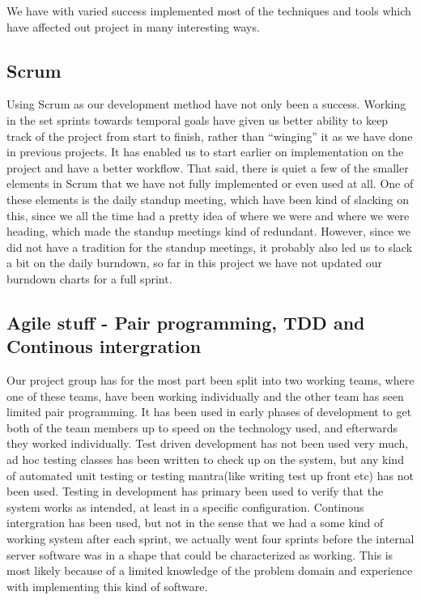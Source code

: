 We have with varied success implemented most of the techniques and tools which have affected out project in many interesting ways.

\subsection*{Scrum}
Using Scrum as our development method have not only been a success. Working in the set sprints towards temporal goals
have given us better ability to keep track of the project from start to finish, rather than ``winging'' it as we have done in previous projects.
It has enabled us to start earlier on implementation on the project and have a better workflow.
That said, there is quiet a few of the smaller elements in Scrum that we have not fully implemented or even used at all.
One of these elements is the daily standup meeting, which have been kind of slacking on this, since we all the time had a pretty idea of where we
were and where we were heading, which made the standup meetings kind of redundant. However, since we did not have a tradition for the standup meetings, it probably also led us to slack
a bit on the daily burndown, so far in this project we have not updated our burndown charts for a full sprint.
 
\subsection*{Agile stuff - Pair programming, TDD and Continous intergration}
Our project group has for the most part been split into two working teams, where one of these teams, have been working individually and the other team has seen limited pair programming.
It has been used in early phases of development to get both of the team members up to speed on the technology used, and efterwards they worked individually.
Test driven development has not been used very much, ad hoc testing classes has been written to check up on the system, but any kind of automated unit testing or testing mantra(like writing test up front etc)
has not been used. Testing in development has primary been used to verify that the system works as intended, at least in a specific configuration.
Continous intergration has been used, but not in the sense that we had a some kind of working system after each sprint, we actually went four sprints before the internal server software was in a shape
that could be characterized as working. This is most likely because of a limited knowledge of the problem domain and experience with implementing this kind of software.

